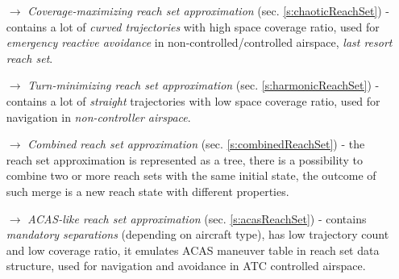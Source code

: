 \begin{itemize}
    \item[$\to$] \emph{Coverage-maximizing reach set approximation} (sec. \ref{s:chaoticReachSet}) - contains a lot of \emph{curved trajectories} with high space coverage ratio, used for \emph{emergency reactive avoidance} in non-controlled/controlled airspace, \emph{last resort reach set}.
    
    \item[$\to$] \emph{Turn-minimizing reach set approximation} (sec. \ref{s:harmonicReachSet}) -  contains a lot of \emph{straight} trajectories with low space coverage ratio, used for navigation in \emph{non-controller airspace}.
    
    \item[$\to$] \emph{Combined reach set approximation} (sec. \ref{s:combinedReachSet}) - the reach set approximation is represented as a tree, there is a possibility to combine two or more reach sets with the same initial state, the outcome of such merge is a new reach state with different properties.
    
    \item[$\to$] \emph{ACAS-like reach set approximation} (sec. \ref{s:acasReachSet}) - contains \emph{mandatory separations} (depending on aircraft type), has low trajectory count and low coverage ratio, it emulates ACAS maneuver table in reach set data structure, used for navigation and avoidance in ATC controlled airspace.
\end{itemize}